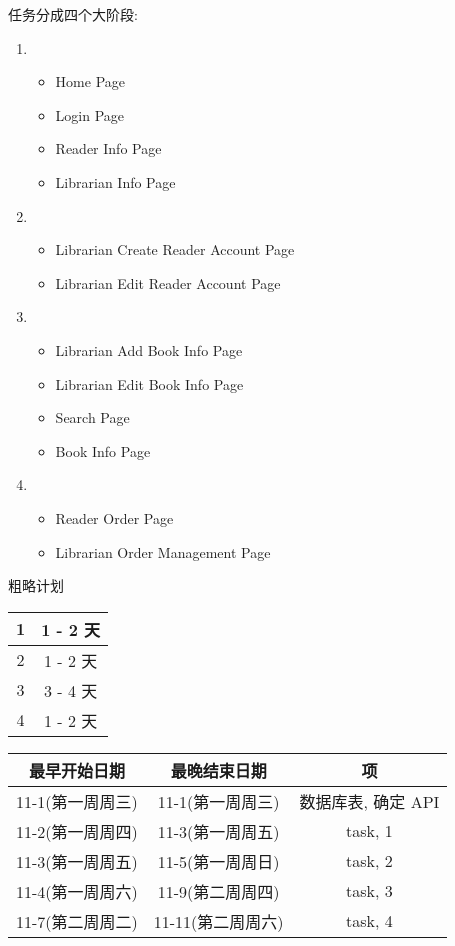\documentclass{ctexart}
\begin{document}
    任务分成四个大阶段:
    \begin{enumerate}
        \item %
            \begin{itemize}
                \item Home Page
                \item Login Page
                \item Reader Info Page
                \item Librarian Info Page
            \end{itemize}
        \item %
            \begin{itemize}
                \item Librarian Create Reader Account Page
                \item Librarian Edit Reader Account Page
            \end{itemize}
        \item %
            \begin{itemize}
                \item Librarian Add Book Info Page
                \item Librarian Edit Book Info Page
                \item Search Page
                \item Book Info Page
            \end{itemize}
        \item %
            \begin{itemize}
                \item Reader Order Page
                \item Librarian Order Management Page
            \end{itemize}
    \end{enumerate}

    粗略计划
    
    \begin{tabular}{|c|c|}
        \hline 
        1 & 1 - 2 天 \\ 
        \hline 
        2 & 1 - 2 天 \\ 
        \hline 
        3 & 3 - 4 天 \\ 
        \hline 
        4 & 1 - 2 天 \\ 
        \hline 
    \end{tabular} 

    \begin{tabular}{|c|c|c|}
        \hline 
        最早开始日期 & 最晚结束日期 & 项 \\
        \hline 
        11-1(第一周周三) & 11-1(第一周周三) & 数据库表, 确定 API \\ 
        \hline 
        11-2(第一周周四) & 11-3(第一周周五) & task, 1 \\ 
        \hline 
        11-3(第一周周五) & 11-5(第一周周日) & task, 2 \\ 
        \hline 
        11-4(第一周周六) & 11-9(第二周周四) & task, 3 \\ 
        \hline 
        11-7(第二周周二) & 11-11(第二周周六) & task, 4 \\ 
        \hline 
    \end{tabular} 
\end{document}
